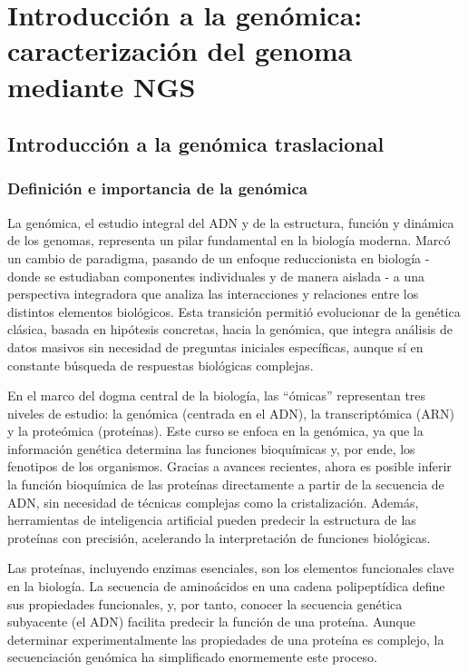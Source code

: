 \chapter{Introducción a la genómica: caracterización del genoma mediante NGS}
\section{Introducción a la genómica traslacional}
\subsection{Definición e importancia de la genómica}
La genómica, el estudio integral del ADN y de la estructura, función y dinámica de los genomas, representa un pilar fundamental en la biología moderna. Marcó un cambio de paradigma, pasando de un enfoque reduccionista en biología - donde se estudiaban componentes individuales y de manera aislada - a una perspectiva integradora que analiza las interacciones y relaciones entre los distintos elementos biológicos. Esta transición permitió evolucionar de la genética clásica, basada en hipótesis concretas, hacia la genómica, que integra análisis de datos masivos sin necesidad de preguntas iniciales específicas, aunque sí en constante búsqueda de respuestas biológicas complejas.

En el marco del dogma central de la biología, las “ómicas” representan tres niveles de estudio: la genómica (centrada en el ADN), la transcriptómica (ARN) y la proteómica (proteínas). Este curso se enfoca en la genómica, ya que la información genética determina las funciones bioquímicas y, por ende, los fenotipos de los organismos. Gracias a avances recientes, ahora es posible inferir la función bioquímica de las proteínas directamente a partir de la secuencia de ADN, sin necesidad de técnicas complejas como la cristalización. Además, herramientas de inteligencia artificial pueden predecir la estructura de las proteínas con precisión, acelerando la interpretación de funciones biológicas.

Las proteínas, incluyendo enzimas esenciales, son los elementos funcionales clave en la biología. La secuencia de aminoácidos en una cadena polipeptídica define sus propiedades funcionales, y, por tanto, conocer la secuencia genética subyacente (el ADN) facilita predecir la función de una proteína. Aunque determinar experimentalmente las propiedades de una proteína es complejo, la secuenciación genómica ha simplificado enormemente este proceso.

